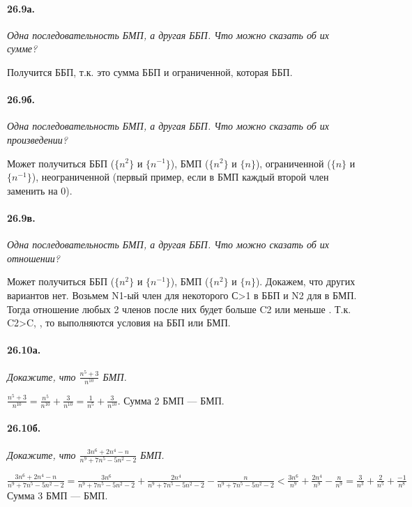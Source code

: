 \documentclass{book}
\begin{document}
\paragraph{26.9а.}
\textit{Одна последовательность БМП, а другая ББП. Что можно сказать об их сумме?}

Получится ББП, т.к. это сумма ББП и ограниченной, которая ББП.

\paragraph{26.9б.}
\textit{Одна последовательность БМП, а другая ББП. Что можно сказать об их произведении?}

Может получиться ББП ($\{n^2\}$ и $\{{n^{-1}}\}$), БМП ($\{n^2\}$ и $\{n\}$), ограниченной ($\{n\}$ и $\{n^{-1}\}$), неограниченной (первый пример, если в БМП каждый второй член заменить на 0).

\paragraph{26.9в.}
\textit{Одна последовательность БМП, а другая ББП. Что можно сказать об их отношении?}

Может получиться ББП ($\{n^2\}$ и $\{{n^{-1}}\}$), БМП ($\{n^2\}$ и $\{n\}$). Докажем, что других вариантов нет. Возьмем N1-ый член для некоторого С>1 в ББП и N2  для  в БМП. Тогда отношение любых 2 членов после них будет больше C2 или меньше . Т.к. C2>C, , то выполняются условия на ББП или БМП. 

\paragraph{26.10а.}
\textit{Докажите, что $\frac{n^5 + 3}{n^{10}}$ БМП.}

$\frac{n^5+3}{n^10} = \frac{n^5}{n^10} + \frac{3}{n^10} = \frac{1}{n^5} + \frac{3}{n^10}$. Сумма 2 БМП — БМП.

\paragraph{26.10б.}
\textit{Докажите, что $\frac{3n^6 + 2n^4 - n}{n^9 + 7n^5 - 5n^2 - 2}$ БМП.}

$\frac{3n^6 + 2n^4 - n}{n^9 + 7n^5 - 5n^2 - 2} = \frac{3n^6}{n^9+7n^5-5n^2-2} + \frac{2n^4}{n^9+7n^5-5n^2-2} - \frac{n}{n^9+7n^5-5n^2-2} < \frac{3n^6}{n^9} + \frac{2n^4}{n^9} - \frac{n}{n^9} = \frac{3}{n^3} + \frac{2}{n^5} + \frac{-1}{n^8}$ Сумма 3 БМП — БМП.
\end{document}
